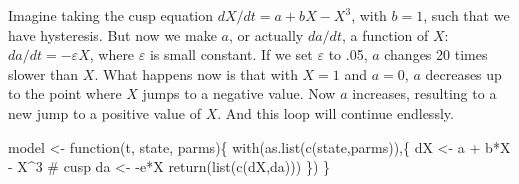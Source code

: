 \documentclass[
  a4paper,
  DIV=11,
  numbers=noendperiod,
  oneside]{scrreprt}
\newenvironment{Shaded}{}{}
\newcommand{\CommentTok}[1]{\textcolor[rgb]{0.42,0.45,0.49}{#1}}
\newcommand{\ControlFlowTok}[1]{\textcolor[rgb]{0.84,0.23,0.29}{#1}}
\newcommand{\DecValTok}[1]{\textcolor[rgb]{0.00,0.36,0.77}{#1}}
\newcommand{\FunctionTok}[1]{\textcolor[rgb]{0.44,0.26,0.76}{#1}}
\newcommand{\NormalTok}[1]{\textcolor[rgb]{0.14,0.16,0.18}{#1}}
\newcommand{\OtherTok}[1]{\textcolor[rgb]{0.44,0.26,0.76}{#1}}
\newcommand{\SpecialCharTok}[1]{\textcolor[rgb]{0.00,0.36,0.77}{#1}}
\begin{document}
Imagine taking the cusp equation \(dX/dt = {a + bX - X}^{3}\), with
\(b=1\), such that we have hysteresis. But now we make \(a\), or
actually \(da/dt\), a function of \(X\): \(da/dt = - \varepsilon X\),
where \(\varepsilon\) is small constant. If we set \(\varepsilon\) to
.05, \(a\) changes 20 times slower than \(X\). What happens now is that
with \(X = 1\) and \(a = 0\), \(a\) decreases up to the point where
\(X\) jumps to a negative value. Now \(a\) increases, resulting to a new
jump to a positive value of \(X\). And this loop will continue
endlessly.

\begin{Shaded}
\begin{Highlighting}[]
\NormalTok{model }\OtherTok{\textless{}{-}} \ControlFlowTok{function}\NormalTok{(t, state, parms)\{}
  \FunctionTok{with}\NormalTok{(}\FunctionTok{as.list}\NormalTok{(}\FunctionTok{c}\NormalTok{(state,parms)),\{}
\NormalTok{    dX }\OtherTok{\textless{}{-}}\NormalTok{  a }\SpecialCharTok{+}\NormalTok{ b}\SpecialCharTok{*}\NormalTok{X }\SpecialCharTok{{-}}\NormalTok{ X}\SpecialCharTok{\^{}}\DecValTok{3}        \CommentTok{\# cusp}
\NormalTok{    da }\OtherTok{\textless{}{-}} \SpecialCharTok{{-}}\NormalTok{e}\SpecialCharTok{*}\NormalTok{X}
    \FunctionTok{return}\NormalTok{(}\FunctionTok{list}\NormalTok{(}\FunctionTok{c}\NormalTok{(dX,da)))}
\NormalTok{  \})}
\NormalTok{\}}


\end{Highlighting}
\end{Shaded}
\end{document}
